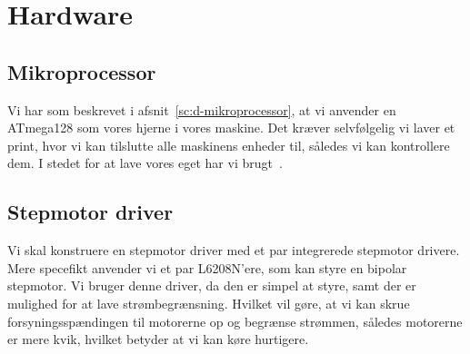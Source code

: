\chapter[Implementering af hardware]{Hardware}


\section{Mikroprocessor}
Vi har som beskrevet i afsnit~\vref{sc:d-mikroprocessor}, at vi
anvender en ATmega128 som vores hjerne i vores maskine. Det kræver
selvfølgelig vi laver et print, hvor vi kan tilslutte alle maskinens
enheder til, således vi kan kontrollere dem. I stedet for at lave
vores eget har vi brugt~\cite{fronter:atmega128}.

\section{Stepmotor driver}
\label{sc:stepmotor-driver}
Vi skal konstruere en stepmotor driver med et par integrerede
stepmotor drivere. Mere specefikt anvender vi et par L6208N'ere, som
kan styre en bipolar stepmotor. Vi bruger denne driver, da den er
simpel at styre, samt der er mulighed for at lave
strømbegrænsning. Hvilket vil gøre, at vi kan skrue
forsyningsspændingen til motorerne op og begrænse strømmen, således
motorerne er mere kvik, hvilket betyder at vi kan køre hurtigere.



